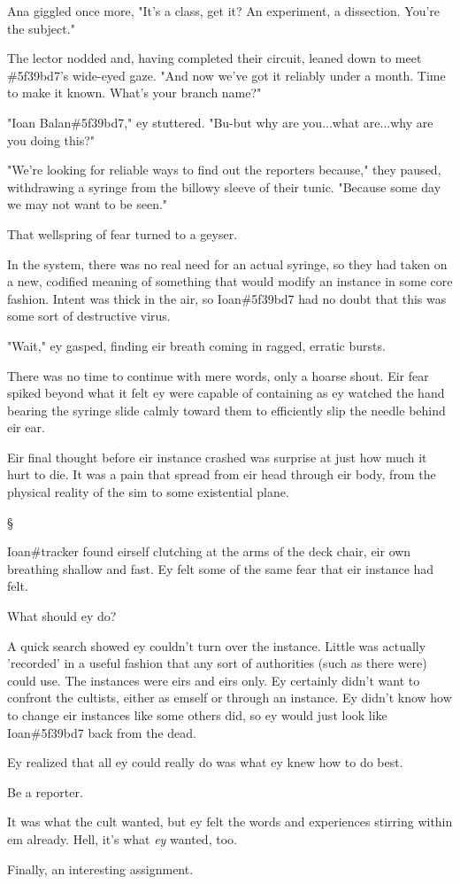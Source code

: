 \documentclass[12pt,letterpaper,oneside]{memoir}
\newcommand\secdiv{
  \begin{center}
    \S
  \end{center}
}
\begin{document}
  Ana giggled once more, "It's a class, get it? An experiment, a dissection. You're the subject."

  The lector nodded and, having completed their circuit, leaned down to meet \#5f39bd7's wide-eyed gaze. "And now we've got it reliably under a month. Time to make it known. What's your branch name?"

  "Ioan Balan\#5f39bd7," ey stuttered. "Bu-but why are you...what are...why are you doing this?"

  "We're looking for reliable ways to find out the reporters because," they paused, withdrawing a syringe from the billowy sleeve of their tunic. "Because some day we may not want to be seen."

  That wellspring of fear turned to a geyser.

  In the system, there was no real need for an actual syringe, so they had taken on a new, codified meaning of something that would modify an instance in some core fashion. Intent was thick in the air, so Ioan\#5f39bd7 had no doubt that this was some sort of destructive virus.

  "Wait," ey gasped, finding eir breath coming in ragged, erratic bursts.

  There was no time to continue with mere words, only a hoarse shout. Eir fear spiked beyond what it felt ey were capable of containing as ey watched the hand bearing the syringe slide calmly toward them to efficiently slip the needle behind eir ear.

  Eir final thought before eir instance crashed was surprise at just how much it hurt to die. It was a pain that spread from eir head through eir body, from the physical reality of the sim to some existential plane.

  \secdiv

  Ioan\#tracker found eirself clutching at the arms of the deck chair, eir own breathing shallow and fast. Ey felt some of the same fear that eir instance had felt.

  What should ey do?

  A quick search showed ey couldn't turn over the instance. Little was actually 'recorded' in a useful fashion that any sort of authorities (such as there were) could use. The instances were eirs and eirs only. Ey certainly didn't want to confront the cultists, either as emself or through an instance. Ey didn't know how to change eir instances like some others did, so ey would just look like Ioan\#5f39bd7 back from the dead.

  Ey realized that all ey could really do was what ey knew how to do best.

  Be a reporter.

  It was what the cult wanted, but ey felt the words and experiences stirring within em already. Hell, it's what \emph{ey} wanted, too.

  Finally, an interesting assignment.
\end{document}
